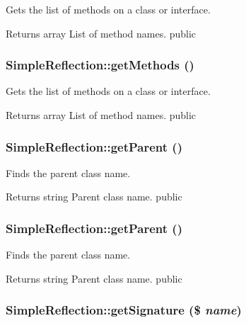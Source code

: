 \label{class_simple_reflection_af595c3f6cffaa3c4c7d6993a65e59206}
Gets the list of methods on a class or interface. \begin{DoxyReturn}{Returns}
array List of method names.  public 
\end{DoxyReturn}
\hypertarget{class_simple_reflection_af595c3f6cffaa3c4c7d6993a65e59206}{
\subsubsection[{getMethods}]{\setlength{\rightskip}{0pt plus 5cm}SimpleReflection::getMethods ()}}
\label{class_simple_reflection_af595c3f6cffaa3c4c7d6993a65e59206}
Gets the list of methods on a class or interface. \begin{DoxyReturn}{Returns}
array List of method names.  public 
\end{DoxyReturn}
\hypertarget{class_simple_reflection_a365526e84d55ce7c97ab78c7770db46e}{
\subsubsection[{getParent}]{\setlength{\rightskip}{0pt plus 5cm}SimpleReflection::getParent ()}}
\label{class_simple_reflection_a365526e84d55ce7c97ab78c7770db46e}
Finds the parent class name. \begin{DoxyReturn}{Returns}
string Parent class name.  public 
\end{DoxyReturn}
\hypertarget{class_simple_reflection_a365526e84d55ce7c97ab78c7770db46e}{
\subsubsection[{getParent}]{\setlength{\rightskip}{0pt plus 5cm}SimpleReflection::getParent ()}}
\label{class_simple_reflection_a365526e84d55ce7c97ab78c7770db46e}
Finds the parent class name. \begin{DoxyReturn}{Returns}
string Parent class name.  public 
\end{DoxyReturn}
\hypertarget{class_simple_reflection_a6145a1e4b2502359151d62f044b86f25}{
\subsubsection[{getSignature}]{\setlength{\rightskip}{0pt plus 5cm}SimpleReflection::getSignature (\$ {\em name})}}
